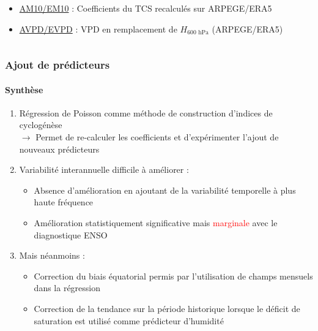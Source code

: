 \documentclass[aspectratio=169, usepdftitle=false, xcolor={dvipsnames}, 9pt,table]{beamer}
\begin{document}
\begin{frame}[t]
\begin{columns}
\begin{column}{0.3\textwidth}
\begin{examples}[Indices]
\begin{itemize}
                    \item \underline{AM10/EM10} : Coefficients du TCS recalculés sur ARPEGE/ERA5
                    \item \underline{AVPD/EVPD} : VPD en remplacement de $H_\text{600~hPa}$ (ARPEGE/ERA5) 
                \end{itemize}
            \end{examples}
            \vspace{1em}
        \end{column}
    \end{columns}
\end{frame}

\begin{frame}[c]
    \frametitle{Ajout de prédicteurs}
    \framesubtitle{Synthèse}
    \begin{block}[Synthèse]
        \small
        \begin{enumerate}
            \setlength\itemsep{1em}
            \item<1-> \alert{Régression de Poisson} comme méthode  de construction d'indices de cyclogénèse\\
                \vspace{0.8ex}
                $\longrightarrow$ Permet de re-calculer les coefficients et d'expérimenter l'ajout de nouveaux prédicteurs
            \item<2-> Variabilité interannuelle \alert{difficile} à améliorer :
                \begin{itemize}
                    \item Absence d'amélioration en ajoutant de la variabilité temporelle à plus haute fréquence
                    \item Amélioration statistiquement \alert{significative} mais \textcolor{red}{marginale} avec le diagnostique ENSO 
                \end{itemize}
            \item<3-> Mais néanmoins :
                \begin{itemize}
                    \item Correction du biais équatorial permis par l'utilisation de champs mensuels dans la régression
                    \item Correction de la tendance sur la période historique lorsque le déficit de saturation est utilisé comme prédicteur d'humidité
                \end{itemize}
        \end{enumerate}
    \end{block}
\end{frame}
\end{document}
